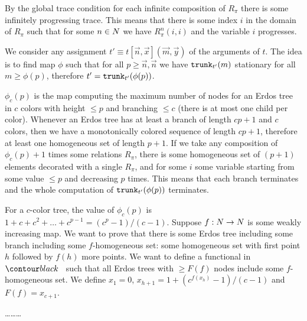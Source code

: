 By the global trace condition for each infinite composition of $R_\pi$ there is some infinitely progressing
trace. This means that there is some index $i$ in the domain of $R_\pi$ such that for some $n \in {N}$
we have $R^n_\pi(i,i)$ and the variable $i$ progresses.


We consider any assignment $t' \equiv t[\vec{n},\vec{x}](\vec{m},\vec{y})$ of the arguments of $t$.
The idea is to find map $\phi$ such that for all $p \ge \vec{n}, \vec{n}$ we have
${\tt trunk}_{t'}(m)$ stationary for all $m \ge \phi(p)$, therefore $t' = {\tt trunk}_{t'}(\phi(p))$.

$\phi_c(p)$ is the map computing the maximum number of nodes for an Erdos tree in $c$
colors with height $\le p$ and branching $\le c$ (there is at most one child per color).
Whenever an Erdos tree has at least a branch of length $cp+1$ and $c$ colors, 
then we have a monotonically colored sequence
of length $cp+1$, therefore at least one homogeneous set of length $p+1$. If we take any composition of 
$\phi_c(p)+1$ times some relations $R_\pi$, there is some homogeneous set of $(p+1)$ elements
decorated with a single $R_\pi$, and for some $i$ some variable starting from some value $\le p$ 
and decreasing $p$ times. 
This means that each branch terminates and the whole computation of ${\tt trunk}_{t'}(\phi(p))$ terminates.

For a $c$-color tree, the value of $\phi_c(p)$ is $1+c+c^2+\ldots+c^{p-1} = (c^{p}-1)/(c-1)$.
Suppose $f:{N} \rightarrow {N}$ is some weakly increasing map. We want to prove that
there is some Erdos tree including some branch including some $f$-homogeneous set: some
homogeneous set with first point $h$ followed by $f(h)$ more points. We
want to define a functional in $\systemT$ such that all Erdos trees with $\ge F(f)$ nodes
include some $f$-homogeneous set.
We define $x_1 = 0$, $x_{h+1} = 1+ (c^{f(x_h)}-1)/(c-1)$ and $F(f) = x_{c+1}$.

\ldots\ldots\ldots



